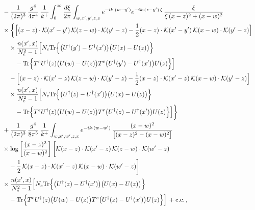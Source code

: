 \begin{align}
&\quad -\frac{1}{(2\pi)^{3}}\, \frac{g^{4}}{4\pi^{4}}\, \frac{1}{k^{+}} \int_{0}^{\infty}\frac{d\xi}{2\pi} \int_{w,x',y',z,x}e^{-ik\cdot(w-y')}e^{-ik\cdot(z-y')\,\xi}\, \frac{\xi}{\xi\,(x-z)^{2}+(x-w)^{2}}\notag\\
&\quad \times\bigg\{\Big[(x-z)\cdot\mathcal{K}(x'-y')\, \mathcal{K}(z-w)\cdot\mathcal{K}(y'-z) -\frac{1}{2}(x-z)\cdot\mathcal{K}(x'-y')\, \mathcal{K}(x-w)\cdot\mathcal{K}(y'-z)\Big]\notag\\
&\quad\quad \times\frac{n(x',x)}{N_{c}^{2}-1}\Big[ N_{c}{\rm Tr}\Big\{\big(U^{\dagger}(y')-U^{\dagger}(x')\big)\big(U(x)-U(z)\big)\Big\}\notag\\
&\quad\quad\quad -{\rm Tr}\Big\{T^{e}U^{\dagger}(z)\big(U(w)-U(z)\big)T^{e}\big(U^{\dagger}(y')-U^{\dagger}(x')\big)U(z)\Big\}\Big]\notag\\
&\quad\quad -\Big[(x-z)\cdot\mathcal{K}(x'-z)\, \mathcal{K}(z-w)\cdot\mathcal{K}(y'-z) -\frac{1}{2}(x-z)\cdot\mathcal{K}(x'-z)\, \mathcal{K}(x-w)\cdot\mathcal{K}(y'-z)\Big]\notag\\
&\quad\quad \times\frac{n(x',x)}{N_{c}^{2}-1}\Big[ N_{c}{\rm Tr}\Big\{\big(U^{\dagger}(z)-U^{\dagger}(x')\big)\big(U(x)-U(z)\big)\Big\}\notag\\
&\quad\quad\quad -{\rm Tr}\Big\{T^{e}U^{\dagger}(z)\big(U(w)-U(z)\big)T^{e}\big(U^{\dagger}(z)-U^{\dagger}(x')\big)U(z)\Big\}\Big]\bigg\}\notag\\
&\quad +\frac{1}{(2\pi)^{3}}\, \frac{g^{4}}{8\pi^{5}}\, \frac{1}{k^{+}} \int_{w,x',w',z,x}e^{-ik\cdot(w-w')}\, \frac{(x-w)^{2}}{\big[(x-z)^{2}-(x-w)^{2}\big]}\notag\\
&\quad \times \log\left[\frac{(x-z)^{2}}{(x-w)^{2}}\right] \bigg[\mathcal{K}(x-z)\cdot\mathcal{K}(x'-z)\, \mathcal{K}(z-w)\cdot\mathcal{K}(w'-z)\notag\\
&\quad\quad -\frac{1}{2}\, \mathcal{K}(x-z)\cdot\mathcal{K}(x'-z)\, \mathcal{K}(x-w)\cdot\mathcal{K}(w'-z)\bigg]\notag\\
&\quad \times \frac{n(x',x)}{N_{c}^{2}-1}\Big[ N_{c}{\rm Tr}\Big\{\big(U^{\dagger}(z)-U^{\dagger}(x')\big)\big(U(x)-U(z)\big)\Big\}\notag\\
&\quad\quad -{\rm Tr}\Big\{T^{e}U^{\dagger}(z)\big(U(w)-U(z)\big)T^{e}\big(U^{\dagger}(z)-U^{\dagger}(x')\big)U(z)\Big\}\Big]\, +{\rm c.c.}\, ,
\end{align}
\endgroup
